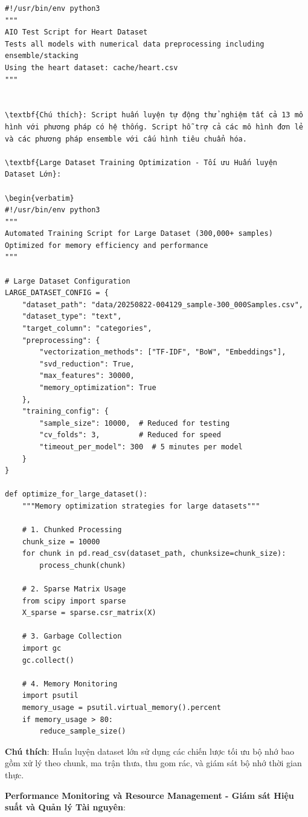 \begin{verbatim}
#!/usr/bin/env python3
"""
AIO Test Script for Heart Dataset
Tests all models with numerical data preprocessing including ensemble/stacking
Using the heart dataset: cache/heart.csv
"""


\textbf{Chú thích}: Script huấn luyện tự động thử nghiệm tất cả 13 mô hình với phương pháp có hệ thống. Script hỗ trợ cả các mô hình đơn lẻ và các phương pháp ensemble với cấu hình tiêu chuẩn hóa.

\textbf{Large Dataset Training Optimization - Tối ưu Huấn luyện Dataset Lớn}:

\begin{verbatim}
#!/usr/bin/env python3
"""
Automated Training Script for Large Dataset (300,000+ samples)
Optimized for memory efficiency and performance
"""

# Large Dataset Configuration
LARGE_DATASET_CONFIG = {
    "dataset_path": "data/20250822-004129_sample-300_000Samples.csv",
    "dataset_type": "text",
    "target_column": "categories",
    "preprocessing": {
        "vectorization_methods": ["TF-IDF", "BoW", "Embeddings"],
        "svd_reduction": True,
        "max_features": 30000,
        "memory_optimization": True
    },
    "training_config": {
        "sample_size": 10000,  # Reduced for testing
        "cv_folds": 3,         # Reduced for speed
        "timeout_per_model": 300  # 5 minutes per model
    }
}

def optimize_for_large_dataset():
    """Memory optimization strategies for large datasets"""
    
    # 1. Chunked Processing
    chunk_size = 10000
    for chunk in pd.read_csv(dataset_path, chunksize=chunk_size):
        process_chunk(chunk)
    
    # 2. Sparse Matrix Usage
    from scipy import sparse
    X_sparse = sparse.csr_matrix(X)
    
    # 3. Garbage Collection
    import gc
    gc.collect()
    
    # 4. Memory Monitoring
    import psutil
    memory_usage = psutil.virtual_memory().percent
    if memory_usage > 80:
        reduce_sample_size()
\end{verbatim}

\textbf{Chú thích}: Huấn luyện dataset lớn sử dụng các chiến lược tối ưu bộ nhớ bao gồm xử lý theo chunk, ma trận thưa, thu gom rác, và giám sát bộ nhớ thời gian thực.

\textbf{Performance Monitoring và Resource Management - Giám sát Hiệu suất và Quản lý Tài nguyên}:

